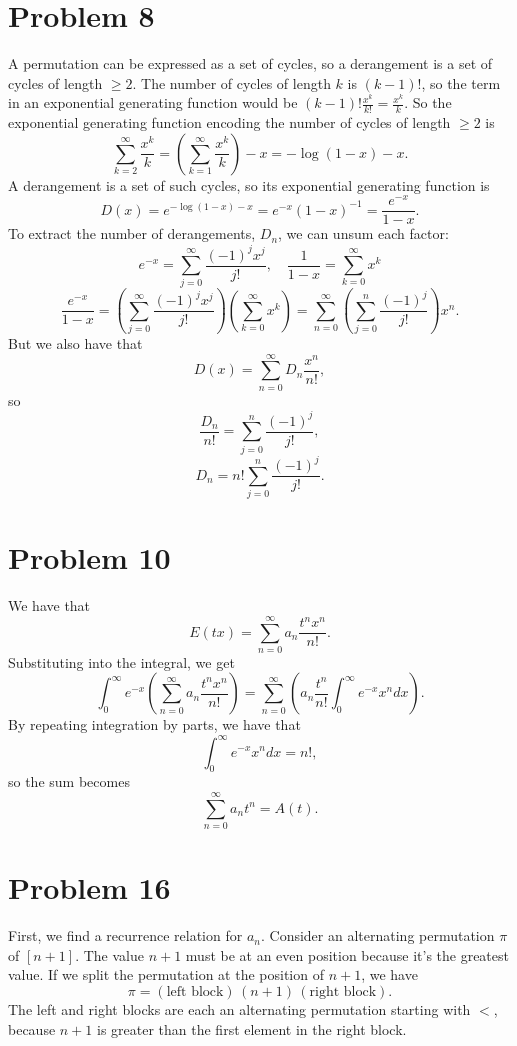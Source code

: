 \documentclass{article}
\newcommand{\bigp}[1]{\left(#1\right)}
\begin{document}
\section*{Problem 8}
A permutation can be expressed as a set of cycles, so a derangement is a set of cycles of length $\ge 2$. The number of cycles of length $k$ is $(k - 1)!$, so the term in an exponential generating function would be $(k - 1)! \frac{x^k}{k!} = \frac{x^k}{k}$. So the exponential generating function encoding the number of cycles of length $\ge 2$ is
$$\sum_{k = 2}^\infty \frac{x^k}{k} = \bigp{\sum_{k = 1}^\infty \frac{x^k}{k}} - x = -\log(1 - x) - x.$$
A derangement is a set of such cycles, so its exponential generating function is
$$D(x) = e^{-\log(1 - x) - x} = e^{-x}(1 - x)^{-1} = \frac{e^{-x}}{1 - x}.$$
To extract the number of derangements, $D_n$, we can unsum each factor:
$$e^{-x} = \sum_{j = 0}^\infty \frac{(-1)^jx^j}{j!}, \quad \frac{1}{1 - x} = \sum_{k = 0}^\infty x^k$$
$$\frac{e^{-x}}{1 - x} = \bigp{\sum_{j = 0}^\infty \frac{(-1)^jx^j}{j!}}\bigp{\sum_{k = 0}^\infty x^k} = \sum_{n = 0}^\infty \bigp{\sum_{j = 0}^n \frac{(-1)^j}{j!}}x^n.$$
But we also have that
$$D(x) = \sum_{n = 0}^\infty D_n\frac{x^n}{n!},$$
so
$$\frac{D_n}{n!} = \sum_{j = 0}^n \frac{(-1)^j}{j!},$$
$$D_n = n!\sum_{j = 0}^n \frac{(-1)^j}{j!}.$$

\section*{Problem 10}
We have that
$$E(tx) = \sum_{n = 0}^\infty a_n \frac{t^nx^n}{n!}.$$
Substituting into the integral, we get
$$\int_0^\infty e^{-x}\bigp{\sum_{n = 0}^\infty a_n \frac{t^nx^n}{n!}} = \sum_{n = 0}^\infty \bigp{a_n \frac{t^n}{n!}\int_0^\infty e^{-x}x^n dx}.$$
By repeating integration by parts, we have that
$$\int_0^\infty e^{-x}x^n dx = n!,$$
so the sum becomes
$$\sum_{n = 0}^\infty a_n t^n = A(t).$$

\section*{Problem 16}
First, we find a recurrence relation for $a_n$. Consider an alternating permutation $\pi$ of $[n + 1]$. The value $n + 1$ must be at an even position because it's the greatest value. If we split the permutation at the position of $n + 1$, we have
$$\pi = (\text{left block})\, (n + 1)\, (\text{right block}).$$
The left and right blocks are each an alternating permutation starting with $<$, because $n + 1$ is greater than the first element in the right block. \\
\end{document}
